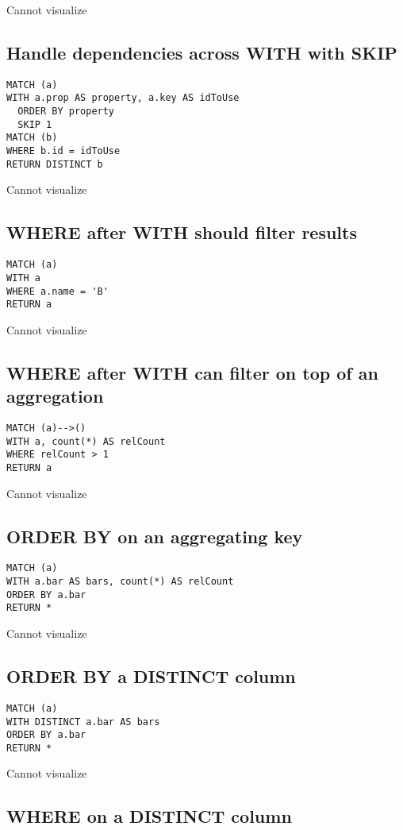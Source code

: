 Cannot visualize
\subsection{Handle dependencies across WITH with SKIP}

\begin{lstlisting}
MATCH (a)
WITH a.prop AS property, a.key AS idToUse
  ORDER BY property
  SKIP 1
MATCH (b)
WHERE b.id = idToUse
RETURN DISTINCT b
\end{lstlisting}

Cannot visualize
\subsection{WHERE after WITH should filter results}

\begin{lstlisting}
MATCH (a)
WITH a
WHERE a.name = 'B'
RETURN a
\end{lstlisting}

Cannot visualize
\subsection{WHERE after WITH can filter on top of an aggregation}

\begin{lstlisting}
MATCH (a)-->()
WITH a, count(*) AS relCount
WHERE relCount > 1
RETURN a
\end{lstlisting}

Cannot visualize
\subsection{ORDER BY on an aggregating key}

\begin{lstlisting}
MATCH (a)
WITH a.bar AS bars, count(*) AS relCount
ORDER BY a.bar
RETURN *
\end{lstlisting}

Cannot visualize
\subsection{ORDER BY a DISTINCT column}

\begin{lstlisting}
MATCH (a)
WITH DISTINCT a.bar AS bars
ORDER BY a.bar
RETURN *
\end{lstlisting}

Cannot visualize
\subsection{WHERE on a DISTINCT column}

